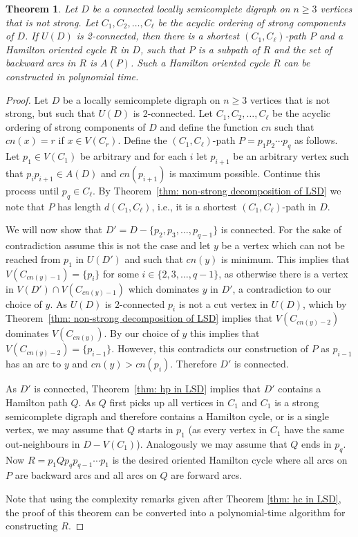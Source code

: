 \documentclass{article}
\newtheorem{theorem}{Theorem}[section]
\newcommand{\YZn}[1]{{#1}}
\newcommand{\GGnn}[1]{{#1}}
\newcommand{\2}{\vspace{0.2cm}}
\begin{document}
\begin{theorem}\label{thm: upper bound of LSD}
Let $D$ be a connected locally semicomplete digraph on $n\ge 3$ vertices that is not strong. Let $C_1, C_2,\dots, C_{\ell}$ be the acyclic ordering of strong components of $D$. If $U(D)$ is 2-connected, then there is a shortest $(C_1,C_{\ell})$-path $P$ and a Hamilton oriented cycle $R$ in $D$, such that $P$ is a subpath of $R$ and the set of backward arcs in $R$ is $A(P)$. Such a Hamilton oriented cycle $R$ can be constructed in polynomial time.
\end{theorem}


\begin{proof}
Let $D$ be a locally semicomplete digraph on $n\ge 3$ vertices that is not strong, but such that $U(D)$ is 2-connected. Let $C_1, C_2,\dots, C_{\ell}$ be the acyclic ordering of strong components of $D$ and define the function $cn$ such that $cn(x) = r$ if $x \in V(C_r)$.
Define the $(C_1,C_{\ell})$-path $P=p_1 p_2 \cdots p_q$ as follows. Let $p_1 \in V(C_1)$ be arbitrary and for each $i$ let $p_{i+1}$ be an arbitrary vertex such that $p_i p_{i+1} \in A(D)$ and $cn(p_{i+1})$ is maximum possible. Continue this process until $p_q \in C_{\ell}$. By Theorem~\ref{thm: non-strong decomposition of LSD} we note that $P$ has length $d(C_1,C_{\ell})$, i.e., it is a shortest $(C_1,C_{\ell})$-path in $D$.

We will now show that $D'=D - \{p_2,p_3,\ldots, p_{q-1}\}$ is connected. For the sake of contradiction assume this is not the case and let $y$ be a vertex which can not be reached from $p_1$ in \GGnn{$U(D')$} and such that $cn(y)$ is minimum.
This implies that $V(C_{cn(y)-1} )= \{p_i\}$ for some $i \in \{2,3,\dots,q-1\}$, as otherwise there is a vertex in $V(D') \cap V(C_{cn(y)-1})$ which dominates $y$ in $D'$, a contradiction to our choice of $y$.
As \GGnn{$U(D)$} is $2$-connected $p_i$ is not a cut vertex in \GGnn{$U(D)$}, which by Theorem~\ref{thm: non-strong decomposition of LSD} implies that $V(C_{cn(y)-2})$ dominates $V(C_{cn(y)})$. By our choice of $y$ this implies that $V(C_{cn(y)-2})=\{p_{i-1}\}$.
However, this contradicts our construction of $P$ as $p_{i-1}$ has an arc to $y$ and $cn(y)>cn(p_i)$. Therefore $D'$ is connected.

As $D'$ is connected, Theorem~\ref{thm: hp in LSD} implies that $D'$ contains a Hamilton path $Q$.
As $Q$ first picks up all vertices in $C_1$ and $C_1$ is a strong semicomplete digraph and therefore contains a Hamilton cycle, or is a single vertex, we may assume that $Q$ starts in $p_1$ (as every vertex in $C_1$ have the same out-neighbours in $D-V(C_1)$). Analogously we may assume that $Q$ ends in $p_q$.
Now \YZn{$R=p_1Qp_qp_{q-1}\cdots p_1$} is the desired oriented Hamilton cycle where all arcs on $P$ are backward arcs and all arcs on $Q$ are forward arcs.

Note that using the complexity remarks given after Theorem \ref{thm: hc in LSD}, the proof of this theorem can be converted into a polynomial-time algorithm for constructing $R.$
    \end{proof}
\end{document}
